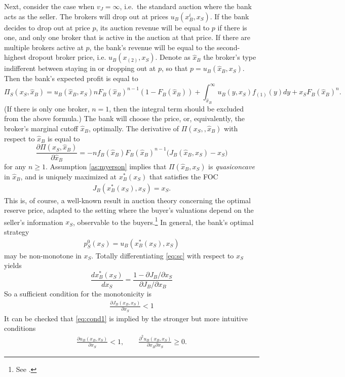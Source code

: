 \documentclass[11pt,twopage]{article}
\begin{document}
Next, consider the case when $v_J = \infty$, i.e.\ the standard
auction where the bank acts as the seller. The brokers will drop out
at prices $u_B(x_B^i,x_S)$. If the bank decides to drop out at price
$p$, its auction revenue will be equal to $p$ if there is one, and
only one broker that is active in the auction at that price. If there
are multiple brokers active at $p$, the bank's revenue will be equal
to the second-highest dropout broker price,
i.e. $u_B(x_{(2)},x_S)$. Denote as $\hat x_B$ the broker's type
indifferent between staying in or dropping out at $p$, so that $p =
u_B(\hat x_B, x_S)$. Then the bank's expected profit is equal to
\[ \Pi_S(x_S, \hat x_B) = u_B(\hat x_B,x_S) n F_B(\hat x_B)^{n-1}
(1-F_B(\hat x_B)) +\int_{\hat x_B}^\infty u_B(y,x_S) f_{(1)}(y) dy
+x_S F_B(\hat x_B)^n.
\]
(If there is only one broker, $n=1$, then the integral term should be
excluded from the above formula.) The bank will choose the price, or,
equivalently, the broker's marginal cutoff $\hat x_B$, optimally. The
derivative of $\Pi (x_S,,\hat x_B)$ with respect to $\hat x_B$ is
equal to
\[ \frac{\partial \Pi (x_S,\hat x_B)}{\partial \hat x_B} = -nf_B(\hat
x_B) F_B(\hat x_B)^{n-1} \Big ( J_B(\hat x_B,x_S) - x_S \Big)
\]
for any $n\geq 1$. Assumption \ref{as:myerson} implies that $\Pi (\hat
x_B,x_S)$ is \emph{quasiconcave} in $\hat x_B$, and is uniquely
maximized at $x_B^*(x_S)$ that satisfies the FOC
\begin{align} J_B(x_B^*(x_S),x_S) = x_S . \label{eq:sc} \end{align}
This is, of course, a well-known result in auction theory concerning
the optimal reserve price, adapted to the setting where the buyer's
valuations depend on the seller's information $x_S$, observable to the
buyers.\footnote{See \cite{myerson1981optimal}.}  In general, the
bank's optimal strategy
\begin{align}
  p_S^0(x_S) = u_B(x_B^*(x_S), x_S) \label{eq:ps0-below-vJ}
\end{align}
may be non-monotone in $x_S$. Totally differentiating \eqref{eq:sc}
with respect to $x_S$ yields
\[ \frac{d x_B^*(x_S)}{dx_S} = \frac{1-\partial J_B/\partial
  x_S}{\partial J_B/\partial x_B} \] So a sufficient condition for the
monotonicity is \begin{align} \frac{\partial J_B(x_B,x_S)}{\partial
    x_S} < 1 \label{eq:cond1}
\end{align}
It can be checked that \eqref{eq:cond1} is implied by the stronger but
more intuitive conditions
\begin{align}
  \frac{\partial u_B(x_B,x_S)}{\partial x_S} <1,\quad \quad
  \frac{\partial^2 u_B(x_B,x_S)}{\partial x_B \partial x_S } \geq 0.
  \label{eq:cond2}
\end{align}
\end{document}
